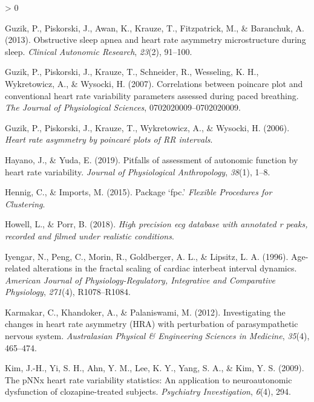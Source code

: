 \documentclass[
  english,
  jou,floatsintext]{apa6}
\newlength{\cslhangindent}
\newenvironment{CSLReferences}[2] %
 {%
  \setlength{\parindent}{0pt}
  \ifodd #1 \everypar{\setlength{\hangindent}{\cslhangindent}}\ignorespaces\fi
  \ifnum #2 > 0
  \setlength{\parskip}{#2\baselineskip}
  \fi
 }%
 {}
\begin{document}
\begin{CSLReferences}{1}{0}
\leavevmode\hypertarget{ref-guzik2013obstructive}{}%
Guzik, P., Piskorski, J., Awan, K., Krauze, T., Fitzpatrick, M., \& Baranchuk, A. (2013). Obstructive sleep apnea and heart rate asymmetry microstructure during sleep. \emph{Clinical Autonomic Research}, \emph{23}(2), 91--100.

\leavevmode\hypertarget{ref-guzik2007correlations}{}%
Guzik, P., Piskorski, J., Krauze, T., Schneider, R., Wesseling, K. H., Wykretowicz, A., \& Wysocki, H. (2007). Correlations between poincare plot and conventional heart rate variability parameters assessed during paced breathing. \emph{The Journal of Physiological Sciences}, 0702020009--0702020009.

\leavevmode\hypertarget{ref-guzik2006heart}{}%
Guzik, P., Piskorski, J., Krauze, T., Wykretowicz, A., \& Wysocki, H. (2006). \emph{Heart rate asymmetry by poincar{é} plots of RR intervals}.

\leavevmode\hypertarget{ref-hayano2019pitfalls}{}%
Hayano, J., \& Yuda, E. (2019). Pitfalls of assessment of autonomic function by heart rate variability. \emph{Journal of Physiological Anthropology}, \emph{38}(1), 1--8.

\leavevmode\hypertarget{ref-hennig2015package}{}%
Hennig, C., \& Imports, M. (2015). Package {`fpc.'} \emph{Flexible Procedures for Clustering}.

\leavevmode\hypertarget{ref-howell2018high}{}%
Howell, L., \& Porr, B. (2018). \emph{High precision ecg database with annotated r peaks, recorded and filmed under realistic conditions}.

\leavevmode\hypertarget{ref-iyengar1996age}{}%
Iyengar, N., Peng, C., Morin, R., Goldberger, A. L., \& Lipsitz, L. A. (1996). Age-related alterations in the fractal scaling of cardiac interbeat interval dynamics. \emph{American Journal of Physiology-Regulatory, Integrative and Comparative Physiology}, \emph{271}(4), R1078--R1084.

\leavevmode\hypertarget{ref-karmakar2012investigating}{}%
Karmakar, C., Khandoker, A., \& Palaniswami, M. (2012). Investigating the changes in heart rate asymmetry (HRA) with perturbation of parasympathetic nervous system. \emph{Australasian Physical \& Engineering Sciences in Medicine}, \emph{35}(4), 465--474.

\leavevmode\hypertarget{ref-kim2009pnnx}{}%
Kim, J.-H., Yi, S. H., Ahn, Y. M., Lee, K. Y., Yang, S. A., \& Kim, Y. S. (2009). The pNNx heart rate variability statistics: An application to neuroautonomic dysfunction of clozapine-treated subjects. \emph{Psychiatry Investigation}, \emph{6}(4), 294.


\end{CSLReferences}
\end{document}
